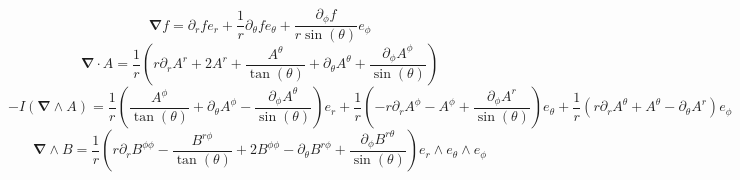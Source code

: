 \documentclass[10pt,fleqn]{report}
\newcommand{\W}{\wedge}
\begin{document}
\begin{equation*} \boldsymbol{\nabla}  f = \partial_{r} f  e_{r} + \frac{1}{r} \partial_{\theta } f  e_{\theta } + \frac{\partial_{\phi } f }{r \sin{\left (\theta  \right )}} e_{\phi } \end{equation*}
\begin{equation*} \boldsymbol{\nabla} \cdot A = \frac{1}{r} \left(r \partial_{r} A^{r}  + 2 A^{r}  + \frac{A^{\theta } }{\tan{\left (\theta  \right )}} + \partial_{\theta } A^{\theta }  + \frac{\partial_{\phi } A^{\phi } }{\sin{\left (\theta  \right )}}\right) \end{equation*}
\begin{equation*} -I (\boldsymbol{\nabla} \W A) = \frac{1}{r} \left(\frac{A^{\phi } }{\tan{\left (\theta  \right )}} + \partial_{\theta } A^{\phi }  - \frac{\partial_{\phi } A^{\theta } }{\sin{\left (\theta  \right )}}\right) e_{r} + \frac{1}{r} \left(- r \partial_{r} A^{\phi }  - A^{\phi }  + \frac{\partial_{\phi } A^{r} }{\sin{\left (\theta  \right )}}\right) e_{\theta } + \frac{1}{r} \left(r \partial_{r} A^{\theta }  + A^{\theta }  - \partial_{\theta } A^{r} \right) e_{\phi } \end{equation*}
\begin{equation*} \boldsymbol{\nabla} \W B = \frac{1}{r} \left(r \partial_{r} B^{\phi \phi }  - \frac{B^{r\phi } }{\tan{\left (\theta  \right )}} + 2 B^{\phi \phi }  - \partial_{\theta } B^{r\phi }  + \frac{\partial_{\phi } B^{r\theta } }{\sin{\left (\theta  \right )}}\right) e_{r}\wedge e_{\theta }\wedge e_{\phi } \end{equation*}
\end{document}
